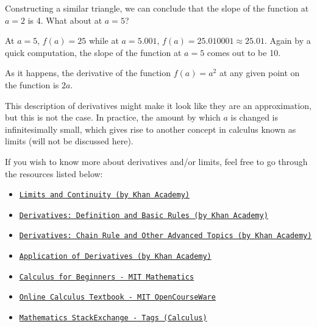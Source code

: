 \documentclass{article}[a4paper,12pt]
\theoremstyle{definition}
\begin{document}
Constructing a similar triangle, we can conclude that the slope of the function at $a=2$ is 4. What about at $a=5$?
\vspace{6pt}

At $a=5$, $f(a)=25$ while at $a=5.001$, $f(a)=25.010001\approx 25.01$. Again by a quick computation, the slope of the function at $a=5$ comes out to be 10.
\vspace{6pt}

As it happens, the derivative of the function $f(a)=a^2$ at any given point on the function is $2a$. 

\vspace{6pt}

This description of derivatives might make it look like they are an approximation, but this is not the case. In practice, the amount by which $a$ is changed is infinitesimally small, which gives rise to another concept in calculus known as limits (will not be discussed here). 
\pagebreak

If you wish to know more about derivatives and/or limits, feel free to go through the resources listed below: 
\begin{itemize}
	\item \texttt{\href{https://www.khanacademy.org/math/calculus-1/cs1-limits-and-continuity}{Limits and Continuity (by Khan Academy)}}
	\item \texttt{\href{https://www.khanacademy.org/math/calculus-1/cs1-derivatives-definition-and-basic-rules}{Derivatives: Definition and Basic Rules (by Khan Academy)}}
	\item \texttt{\href{https://www.khanacademy.org/math/calculus-1/cs1-derivatives-chain-rule-and-other-advanced-topics}{Derivatives: Chain Rule and Other Advanced Topics (by Khan Academy)}}
	\item \texttt{\href{https://www.khanacademy.org/math/calculus-1/cs1-applications-of-derivatives}{Application of Derivatives (by Khan Academy)}}
	\item \texttt{\href{http://www-math.mit.edu/~djk/calculus_beginners/}{Calculus for Beginners - MIT Mathematics}}
	\item \texttt{\href{https://ocw.mit.edu/resources/res-18-001-calculus-online-textbook-spring-2005/textbook/}{Online Calculus Textbook - MIT OpenCourseWare}}
	\item \texttt{\href{https://math.stackexchange.com/questions/tagged/calculus}{Mathematics StackExchange - Tags (Calculus)}}
\end{itemize}
\end{document}
